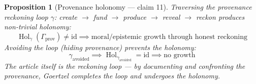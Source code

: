 \documentclass[11pt,a4paper]{article}
\newtheorem{proposition}[definition]{Proposition}
\begin{document}
\begin{proposition}[Provenance holonomy --- claim 11]
\label{prop:holonomy}
Traversing the provenance reckoning loop $\gamma$: create $\to$ fund
$\to$ produce $\to$ reveal $\to$ reckon produces non-trivial holonomy:
\[
  \operatorname{Hol}_\gamma(\Gamma_{\text{prov}}) \neq \mathrm{id}
  \implies \text{moral/epistemic growth through honest reckoning}
\]
Avoiding the loop (hiding provenance) prevents the holonomy:
\[
  \gamma_{\text{avoided}} \implies
  \operatorname{Hol}_{\gamma_{\text{avoided}}} = \mathrm{id}
  \implies \text{no growth}
\]
The article itself is the reckoning loop --- by documenting and
confronting the provenance, Goertzel completes the loop and
undergoes the holonomy.
\end{proposition}
\end{document}

